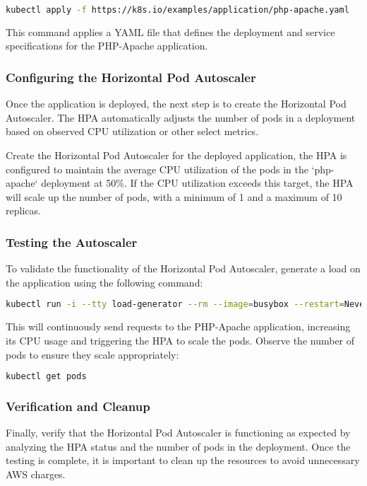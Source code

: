 \begin{lstlisting}[language=bash, label={lst:deploy-application}, caption={Deploying PHP application}]
kubectl apply -f https://k8s.io/examples/application/php-apache.yaml
\end{lstlisting}

This command applies a YAML file that defines the deployment and service specifications for the PHP-Apache application.

\subsubsection{Configuring the Horizontal Pod Autoscaler}

Once the application is deployed, the next step is to create the Horizontal Pod Autoscaler. The HPA automatically adjusts the number of pods in a deployment based on observed CPU utilization or other select metrics.

Create the Horizontal Pod Autoscaler for the deployed application, the HPA is configured to maintain the average CPU utilization of the pods in the `php-apache` deployment at 50\%. If the CPU utilization exceeds this target, the HPA will scale up the number of pods, with a minimum of 1 and a maximum of 10 replicas.

\subsubsection{Testing the Autoscaler}

To validate the functionality of the Horizontal Pod Autoscaler, generate a load on the application using the following command:

\begin{lstlisting}[language=bash, label={lst:autoscaler-test}, caption={Autoscaler test}]
kubectl run -i --tty load-generator --rm --image=busybox --restart=Never -- /bin/sh -c "while sleep 0.01; do wget -q -O- http://php-apache; done"
\end{lstlisting}

This will continuously send requests to the PHP-Apache application, increasing its CPU usage and triggering the HPA to scale the pods. Observe the number of pods to ensure they scale appropriately:

\begin{lstlisting}[language=bash, label={lst:pods-number}, caption={Get the number of pods}]
kubectl get pods
\end{lstlisting}

\subsubsection{Verification and Cleanup}

Finally, verify that the Horizontal Pod Autoscaler is functioning as expected by analyzing the HPA status and the number of pods in the deployment. Once the testing is complete, it is important to clean up the resources to avoid unnecessary AWS charges.
